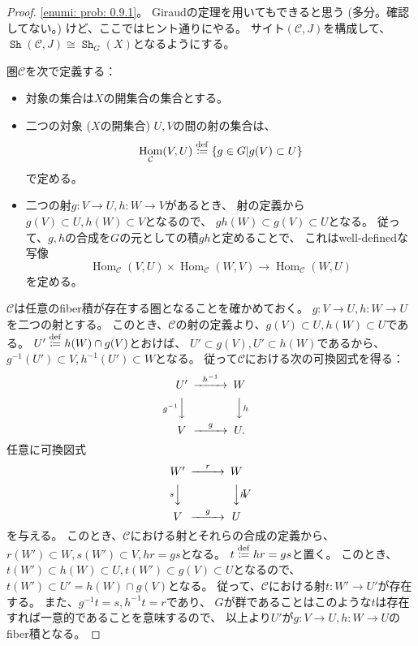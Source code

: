 \documentclass[uplatex]{jsarticle}
\theoremstyle{definition}
\DeclareMathOperator{\Hom}{Hom}
\def\mcC{\mathcal{C}}
\newcommand{\dfn}{\overset{\mathrm{\tiny def}}{\coloneqq}}
\DeclareMathOperator{\Sh}{\mathtt{Sh}}
\begin{document}
\begin{proof}
  \ref{enumi: prob: 0.9.1}。
  Giraudの定理を用いてもできると思う (多分。確認してない。)
  けど、ここではヒント通りにやる。
  サイト\((\mcC,J)\)を構成して、
  \(\Sh(\mcC,J)\cong \Sh_G(X)\)となるようにする。

  圏\(\mcC\)を次で定義する：
  \begin{itemize}
    \item
    対象の集合は\(X\)の開集合の集合とする。
    \item
    二つの対象 (\(X\)の開集合) \(U,V\)の間の射の集合は、
    \[\Hom_{\mcC}(V,U) \dfn \left\{ g\in G\middle| g(V)\subset U\right\}\]
    で定める。
    \item
    二つの射\(g:V\to U, h:W\to V\)があるとき、
    射の定義から\(g(V)\subset U, h(W)\subset V\)となるので、
    \(gh(W)\subset g(V)\subset U\)となる。
    従って、\(g,h\)の合成を\(G\)の元としての積\(gh\)と定めることで、
    これはwell-definedな写像
    \[\Hom_{\mcC}(V,U)\times\Hom_{\mcC}(W,V) \to \Hom_{\mcC}(W,U)\]
    を定める。
  \end{itemize}
  \(\mcC\)は任意のfiber積が存在する圏となることを確かめておく。
  \(g:V\to U , h:W\to U\)を二つの射とする。
  このとき、\(\mcC\)の射の定義より、\(g(V)\subset U, h(W)\subset U\)である。
  \(U'\dfn h(W)\cap g(V)\)とおけば、
  \(U'\subset g(V), U'\subset h(W)\)であるから、
  \(g^{-1}(U')\subset V, h^{-1}(U')\subset W\)となる。
  従って\(\mcC\)における次の可換図式を得る：
  \[
  \begin{CD}
    U' @>h^{-1}>> W \\
    @V g^{-1} VV @VV h V \\
    V @>g>> U.
  \end{CD}
  \]
  任意に可換図式
  \[
  \begin{CD}
    W' @>r>> W \\
    @V s VV @VV h VV \\
    V @>g>> U
  \end{CD}
  \]
  を与える。
  このとき、\(\mcC\)における射とそれらの合成の定義から、
  \(r(W')\subset W, s(W')\subset V, hr = gs\)となる。
  \(t \dfn hr = gs\)と置く。
  このとき、\(t(W')\subset h(W) \subset U , t(W')\subset g(V)\subset U\)となるので、
  \(t(W')\subset U' = h(W)\cap g(V)\)となる。
  従って、\(\mcC\)における射\(t: W'\to U'\)が存在する。
  また、\(g^{-1}t = s, h^{-1}t = r\)であり、
  \(G\)が群であることはこのような\(t\)は存在すれば一意的であることを意味するので、
  以上より\(U'\)が\(g:V\to U,h:W\to U\)のfiber積となる。


\end{proof}
\end{document}
